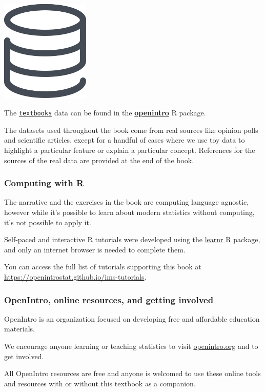 \documentclass[
  10pt,
  openany]{book}
\newenvironment{mdframedwithfootTipDataPro}
{   
    \savenotes
    \begin{mdframed}[%
    topline=true, bottomline=true, linecolor=oiGray, linewidth=0.5pt,
    rightline=false, leftline=false,
    backgroundcolor=oiLGray]
    \renewcommand{\thempfootnote}{\arabic{footnote}}
    }
{
    \end{mdframed}
    \spewnotes
}
\newenvironment{data}{
\vspace{4mm}
\begin{mdframedwithfootTipDataPro}
\begin{minipage}[t]{0.10\textwidth}
{$\:$ \\ \setkeys{Gin}{width=2em,keepaspectratio}\includegraphics{images/_icons/data.png}}
\end{minipage}
\hfill
\begin{minipage}[t]{0.90\textwidth}
\vspace{-2mm}
\setlength{\parskip}{1em}
}{\end{minipage}
\end{mdframedwithfootTipDataPro}
\vspace{4mm}
}
\begin{document}
\begin{data}
The \href{http://openintrostat.github.io/openintro/reference/textbooks.html}{\texttt{textbooks}} data can be found in the \href{http://openintrostat.github.io/openintro}{\textbf{openintro}} R package.

\end{data}

The datasets used throughout the book come from real sources like opinion polls and scientific articles, except for a handful of cases where we use toy data to highlight a particular feature or explain a particular concept.
References for the sources of the real data are provided at the end of the book.

\hypertarget{computing-with-r}{%
\subsubsection*{Computing with R}\label{computing-with-r}}

The narrative and the exercises in the book are computing language agnostic, however while it's possible to learn about modern statistics without computing, it's not possible to apply it.

Self-paced and interactive R tutorials were developed using the \href{https://rstudio.github.io/learnr/index.html}{learnr} R package, and only an internet browser is needed to complete them.

You can access the full list of tutorials supporting this book at\\
\url{https://openintrostat.github.io/ims-tutorials}.

\clearpage

\hypertarget{openintro-online-resources-and-getting-involved}{%
\subsubsection*{OpenIntro, online resources, and getting involved}\label{openintro-online-resources-and-getting-involved}}

OpenIntro is an organization focused on developing free and affordable education materials.

We encourage anyone learning or teaching statistics to visit \href{http://www.openintro.org}{openintro.org} and to get involved.

All OpenIntro resources are free and anyone is welcomed to use these online tools and resources with or without this textbook as a companion.
\end{document}
